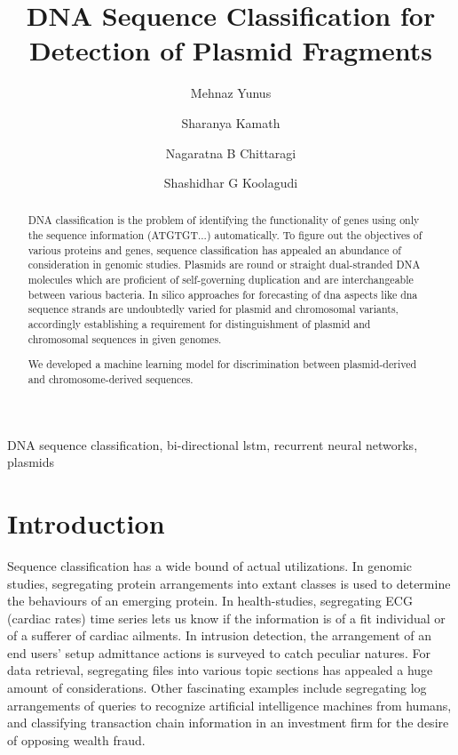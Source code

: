 \documentclass[conference]{IEEEtran}
\begin{document}
\title{DNA Sequence Classification for Detection of Plasmid Fragments}

\author[1]{Mehnaz Yunus}
\author[1]{Sharanya Kamath}
\author[1]{Nagaratna B Chittaragi}
\author[1]{Shashidhar G Koolagudi}

\maketitle

\begin{abstract}
DNA classification is the problem of identifying the functionality of genes using only the sequence information (ATGTGT...) automatically. To figure out the objectives of various proteins and genes, sequence classification has appealed an abundance of consideration in genomic studies. Plasmids are round or straight dual-stranded DNA molecules which are proficient of self-governing duplication and are interchangeable between various bacteria. In silico approaches for forecasting of dna aspects like dna sequence strands are undoubtedly varied for plasmid and chromosomal variants, accordingly establishing a requirement for distinguishment of plasmid and chromosomal sequences in given genomes. 

We developed a machine learning model for discrimination between plasmid-derived and chromosome-derived sequences.

\end{abstract}

\begin{IEEEkeywords}
DNA sequence classification, bi-directional lstm, recurrent neural networks, plasmids
\end{IEEEkeywords}

\section{Introduction}
Sequence classification has a wide bound of actual utilizations. In genomic studies, segregating protein arrangements into extant classes is used to determine the behaviours of an emerging protein. In health-studies, segregating ECG (cardiac rates) time series lets us know if the information is of a fit individual or of a sufferer of cardiac ailments. In intrusion detection, the arrangement of an end users’ setup admittance actions is surveyed to catch peculiar natures. For data retrieval, segregating files into various topic sections has appealed a huge amount of considerations. Other fascinating examples include segregating log arrangements of queries to recognize artificial intelligence machines from humans, and classifying transaction chain information in an investment firm for the desire of opposing wealth fraud.
\newline
\end{document}
